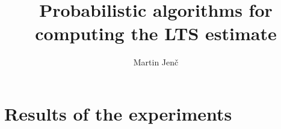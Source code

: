 \documentclass[thesis=B,english]{FITthesis}[2012/10/20]
\title{Probabilistic algorithms for computing the LTS estimate}
\author{Martin Jen{\v c}} %
\begin{document}


























\appendix

\chapter{Results of the experiments} \label{apendix:chapter}
\end{document}
